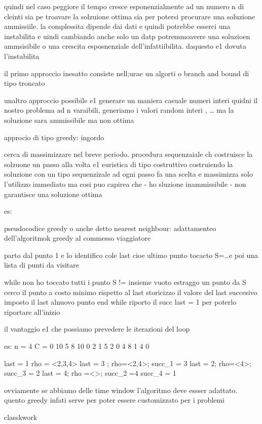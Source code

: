 quindi nel caso peggiore il tempo cresce esponenzialmente ad un numero n di cleinti sia pe troavare la solzuione ottima sia per potersi procurare una soluzione ammissiile. la complessita dipende dai dati  e quindi potrebbe esserci una instabilita e uindi cambiando anche solo un datp potremmoavere una soluzioen ammsisibile o una crescita esposnenziale dell’infattiibilita.
 daquesto e1 dovuta l’instabilita


il primo approccio inesatto consiste nell;urae un algorti o branch and bound di tipo troncato

unaltro approccio possibile e1 generare un maniera casuale numeri interi quidni il nostro problema ad n varaibili, generiamo i valori random interi , … ma la soluzione sara ammissibile ma non ottima


approcio di tipo greedy: ingordo

cerca di massimizzare nel breve periodo. procedura sequenzaiale ch costruisce la solzuone un  passo alla volta 
e1 euristica di tipo costruttivo costruiendo la soluzione con un tipo sequenzizale ad ogni passo fa una scelta e massimizza solo l’utilizzo immediato ma cosi puo capirea che
- ho sluzione inammissibile
- non garantisce una soluzione ottima

es: 

pseudocodice greedy o anche detto nearest neighbour: adattamenteo dell’algoritmok greedy al commesso viaggiatore

parto dal punto 1 e lo identifico cole last cioe ultimo punto tocacto 
S={…}e poi una lista di punti da visitare

while non ho toccato tutti i punto S != insieme vuoto
estraggo un punto da S
cerco il punto a costo minimo rispetto al last 
storicizzo il valore del last succesivo
imposto il last alnuovo punto 
end while
riporto il succ last = 1 per poterlo riportare all’inizio


il vantaggio e1 che possiamo prevedere le iterazioni del loop 

es:
n = 4
C = 
0 10 5 8
10 0 2 1 
5 2 0 4
8 1 4 0

last = 1 rho = <2,3,4>
last = 3 ; rho=<2,4>; succ_1 = 3
last = 2; rho=<4>; succ_3 = 2
last = 4; rho =<>; succ_2 =4
succ_4 = 1

ovviamente se abbiamo delle time window l’algoritmo deve essser adattato. quento greedy infati serve per poter essere customizzato per i problemi




classkwork

